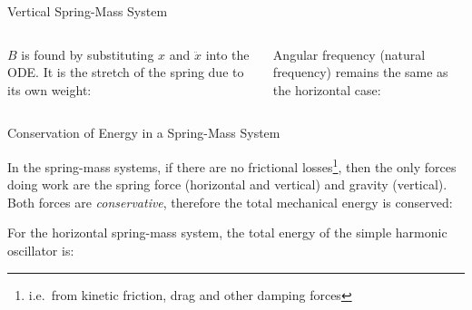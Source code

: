 \documentclass[12pt,compress,aspectratio=169]{beamer}
\begin{document}
\begin{frame}{Vertical Spring-Mass System}
  \begin{columns}

    $B$ is found by substituting $x$ and $\ddot x$ into the ODE. It is the
    stretch of the spring due to its own weight:
    

    Angular frequency (natural frequency) remains the same as the horizontal
    case:

  \end{columns}
\end{frame}



\begin{frame}{Conservation of Energy in a Spring-Mass System}

  In the spring-mass systems, if there are no frictional losses\footnote{i.e.\
  from kinetic friction, drag and other damping forces}, then the only
  forces doing work are the spring force (horizontal and vertical) and gravity
  (vertical). Both forces are \emph{conservative}, therefore the total
  mechanical energy is conserved:

  
  For the horizontal spring-mass system, the total energy of the simple harmonic
  oscillator is:
    
  
  \vspace{.2in}
\end{frame}
\end{document}
